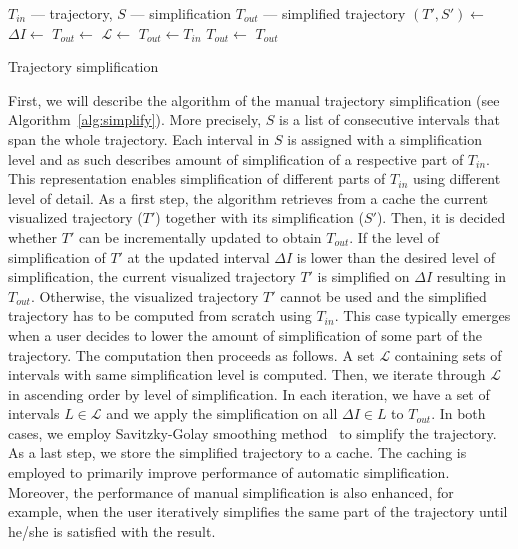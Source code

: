 \begin{algorithm}
  \begin{algorithmic}[1]
	  \Require $T_{in}$ --- trajectory, $S$ --- simplification
	  \Ensure $T_{out}$ --- simplified trajectory
			\State $(T', S') \gets$  
			\State
			  \State $\Delta I \gets$ 
				\State $T_{out} \gets$ 
			\Else %
			  \State $\mathcal{L} \gets$  
				\State $T_{out} \gets T_{in}$
				 
					  \State $T_{out} \gets$ 
					\EndFor
				\EndFor
			\EndIf
			\State
			\State {}
			\State \Return $T_{out}$
		\EndProcedure
  \end{algorithmic}
	\caption{Trajectory simplification}
  \label{alg:simplify}
\end{algorithm}

First, we will describe the algorithm of the manual trajectory simplification (see Algorithm~\ref{alg:simplify}).
More precisely, $S$ is a list of consecutive intervals that span the whole trajectory.
Each interval in $S$ is assigned with a simplification level and as such describes amount of simplification of a respective part of $T_{in}$.
This representation enables simplification of different parts of $T_{in}$ using different level of detail.
As a first step, the algorithm retrieves from a cache the current visualized trajectory ($T'$) together with its simplification ($S'$).
Then, it is decided whether $T'$ can be incrementally updated to obtain $T_{out}$.
If the level of simplification of $T'$ at the updated interval $\Delta I$ is lower than the desired level of simplification, the current visualized trajectory $T'$ is simplified on $\Delta I$ resulting in $T_{out}$.
Otherwise, the visualized trajectory $T'$ cannot be used and the simplified trajectory has to be computed from scratch using $T_{in}$.
This case typically emerges when a user decides to lower the amount of simplification of some part of the trajectory.
The computation then proceeds as follows.
A set $\mathcal{L}$ containing sets of intervals with same simplification level is computed.
Then, we iterate through $\mathcal{L}$ in ascending order by level of simplification.
In each iteration, we have a set of intervals $L \in \mathcal{L}$ and we apply the simplification on all $\Delta I \in L$ to $T_{out}$.
In both cases, we employ Savitzky-Golay smoothing method~\cite{savitzky1964smoothing} to simplify the trajectory.
As a last step, we store the simplified trajectory to a cache.
The caching is employed to primarily improve performance of automatic simplification.
Moreover, the performance of manual simplification is also enhanced, for example, when the user iteratively simplifies the same part of the trajectory until he/she is satisfied with the result.

